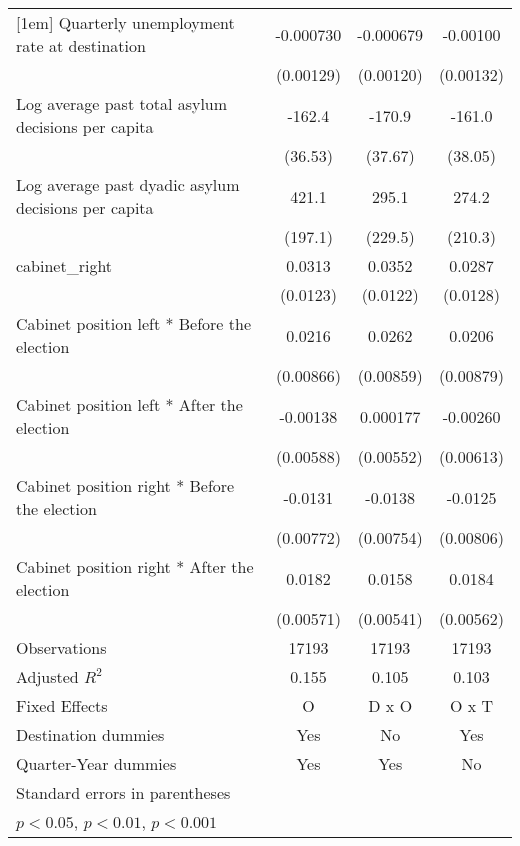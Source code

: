 \begin{table}[htbp]
\begin{tabular}{l*{3}{c}}
[1em]
Quarterly unemployment rate at destination&   -0.000730         &   -0.000679         &    -0.00100         \\
                    &   (0.00129)         &   (0.00120)         &   (0.00132)         \\
[1em]
Log average past total asylum decisions per capita&      -162.4\sym{***}&      -170.9\sym{***}&      -161.0\sym{***}\\
                    &     (36.53)         &     (37.67)         &     (38.05)         \\
[1em]
Log average past dyadic asylum decisions per capita&       421.1\sym{*}  &       295.1         &       274.2         \\
                    &     (197.1)         &     (229.5)         &     (210.3)         \\
[1em]
cabinet\_right       &      0.0313\sym{*}  &      0.0352\sym{**} &      0.0287\sym{*}  \\
                    &    (0.0123)         &    (0.0122)         &    (0.0128)         \\
[1em]
Cabinet position left * Before the election&      0.0216\sym{*}  &      0.0262\sym{**} &      0.0206\sym{*}  \\
                    &   (0.00866)         &   (0.00859)         &   (0.00879)         \\
[1em]
Cabinet position left * After the election&    -0.00138         &    0.000177         &    -0.00260         \\
                    &   (0.00588)         &   (0.00552)         &   (0.00613)         \\
[1em]
Cabinet position right * Before the election&     -0.0131         &     -0.0138         &     -0.0125         \\
                    &   (0.00772)         &   (0.00754)         &   (0.00806)         \\
[1em]
Cabinet position right * After the election&      0.0182\sym{**} &      0.0158\sym{**} &      0.0184\sym{**} \\
                    &   (0.00571)         &   (0.00541)         &   (0.00562)         \\
\hline
Observations        &       17193         &       17193         &       17193         \\
Adjusted \(R^{2}\)  &       0.155         &       0.105         &       0.103         \\
Fixed Effects       &           O         &       D x O         &       O x T         \\
Destination dummies &         Yes         &          No         &         Yes         \\
Quarter-Year dummies&         Yes         &         Yes         &          No         \\
\hline\hline
\multicolumn{4}{l}{\footnotesize Standard errors in parentheses}\\
\multicolumn{4}{l}{\footnotesize \sym{*} \(p<0.05\), \sym{**} \(p<0.01\), \sym{***} \(p<0.001\)}\\
\end{tabular}
\end{table}
